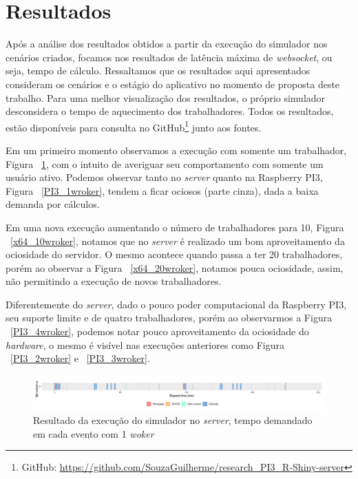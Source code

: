 \documentclass[12pt,english,brazil]{article}
\begin{document}
\section{Resultados} \label{sec:Resultados}
Após a análise dos resultados obtidos a partir da execução do simulador nos cenários criados, focamos nos resultados de latência máxima de \emph{websocket}, ou seja, tempo de cálculo. Ressaltamos que os resultados aqui apresentados consideram os cenários e o estágio do aplicativo no momento de proposta deste trabalho. Para uma melhor visualização dos resultados, o próprio simulador desconsidera o tempo de aquecimento dos trabalhadores. Todos os resultados, estão disponíveis para consulta no GitHub\footnote{GitHub: \url{https://github.com/SouzaGuilherme/research_PI3_R-Shiny-server}} junto aos fontes.

Em um primeiro momento observamos a execução com somente um trabalhador, Figura ~\ref{x64_1wroker}, com o intuito de averiguar seu comportamento com somente um usuário ativo. Podemos observar tanto no \emph{server} quanto na Raspberry PI3, Figura ~\ref{PI3_1wroker}, tendem a ficar ociosos (parte cinza), dada a baixa demanda por cálculos. 

Em uma nova execução aumentando o número de trabalhadores para 10, Figura ~\ref{x64_10wroker}, notamos que no \emph{server} é realizado um bom aproveitamento da ociosidade do servidor. O mesmo acontece quando passa a ter 20 trabalhadores, porém ao observar a Figura ~\ref{x64_20wroker}, notamos pouca ociosidade, assim, não permitindo a execução de novos trabalhadores.

Diferentemente do \emph{server}, dado o pouco poder computacional da Raspberry PI3, seu suporte limite e de quatro trabalhadores, porém ao observarmos a Figura ~\ref{PI3_4wroker}, podemos notar pouco aproveitamento da ociosidade do \emph{hardware}, o mesmo é visível nas execuções anteriores como Figura ~\ref{PI3_2wroker} e ~\ref{PI3_3wroker}.



\begin{figure}[htbp]
  \centering 
  \includegraphics[scale=.4]{paperWSCAD2021/figures/user_x64_1_worker.png}
  \caption{Resultado da execução do simulador no \emph{server}, tempo demandado em cada evento com 1 \emph{woker}}
  \label{x64_1wroker}
\end{figure}
\end{document}
